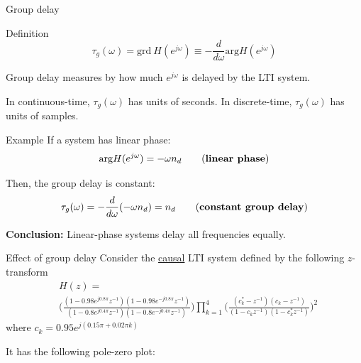 \documentclass[10pt, handout]{beamer}
\begin{document}
%
\begin{frame}{Group delay}
	\begin{block}{Definition}
		\begin{equation*}
			\tau_g(\omega) = \mathrm{grd}~ H(e^{j\omega}) \equiv -\dfrac{d}{d\omega}\mathrm{arg} H(e^{j\omega}) \tag{group delay}
		\end{equation*}
		
		Group delay measures by how much $e^{j\omega}$ is delayed by the LTI system. 
		
		In continuous-time, $\tau_g(\omega)$ has units of seconds. In discrete-time, $\tau_g(\omega)$ has units of samples.
	\end{block}
	
	\begin{block}{Example}
		If a system has linear phase:
		\begin{equation*}
			\mathrm{arg} H(e^{j\omega}) = -\omega n_d \tag{\textbf{linear phase}}
		\end{equation*} 
		
		Then, the group delay is constant:
		\begin{equation*}
		\tau_g(\omega) = -\dfrac{d}{d\omega}(-\omega n_d) = n_d \tag{\textbf{constant group delay}}
		\end{equation*} 
		
		\textbf{Conclusion:} Linear-phase systems delay all frequencies equally.	
	\end{block}
\end{frame}


\begin{frame}{Effect of group delay}
	Consider the \underline{causal} LTI system defined by the following $z$-transform
	\begin{align*}
	&H(z) = \\ &\bigg(\frac{(1-0.98e^{j0.8\pi}z^{-1})(1-0.98e^{-j0.8\pi}z^{-1})}{(1-0.8e^{j0.4\pi}z^{-1})(1-0.8e^{-j0.4\pi}z^{-1})}\bigg)\prod_{k=1}^4\bigg(\frac{(c_k^* -z^{-1})(c_k -z^{-1})}{(1 -c_kz^{-1})(1 -c_k^*z^{-1})}\bigg)^2
	\end{align*}
	where $c_k = 0.95e^{j(0.15\pi + 0.02\pi k)}$
	
	It has the following pole-zero plot:
	
	\begin{center}
		\resizebox{0.5\linewidth}{!}{}
	\end{center}
\end{frame}
\end{document}
